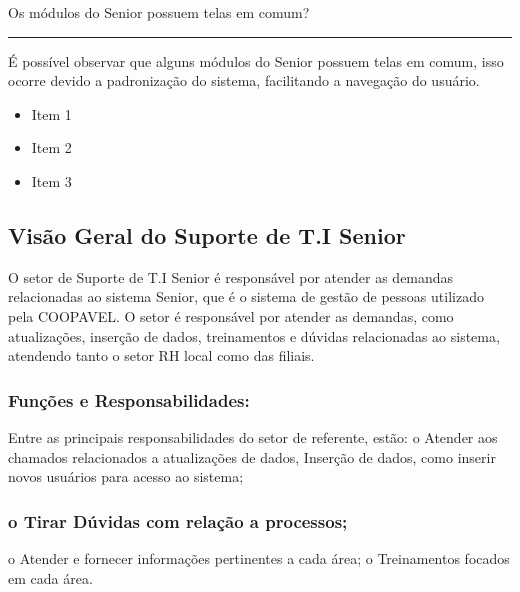 \documentclass[letterpaper,10pt,portuges]{sphinxmanual}
\begin{document}
\sphinxAtStartPar
Os módulos do Senior possuem telas em comum?


\bigskip\hrule\bigskip


\sphinxAtStartPar
É possível observar que alguns módulos do Senior possuem telas em comum, isso ocorre devido a padronização do sistema,
facilitando a navegação do usuário.
\begin{itemize}
\item {} 
\sphinxAtStartPar
Item 1

\item {} 
\sphinxAtStartPar
Item 2

\item {} 
\sphinxAtStartPar
Item 3

\end{itemize}

\noindent{}

\sphinxstepscope


\subsection{Visão Geral do Suporte de T.I Senior}
\label{\detokenize{visao_geral:visao-geral-do-suporte-de-t-i-senior}}\label{\detokenize{visao_geral::doc}}
\sphinxAtStartPar
O setor de Suporte de T.I Senior é responsável por atender as demandas
relacionadas ao sistema Senior, que é o sistema de gestão de pessoas
utilizado pela COOPAVEL. O setor é responsável por atender as demandas, como atualizações, inserção de dados, treinamentos
e dúvidas relacionadas ao sistema, atendendo tanto o setor RH local como das filiais.


\subsubsection{Funções e Responsabilidades:}
\label{\detokenize{visao_geral:funcoes-e-responsabilidades}}
\sphinxAtStartPar
Entre as principais responsabilidades do setor de referente, estão:
o Atender aos chamados relacionados a atualizações de dados,
Inserção de dados, como inserir novos usuários para acesso ao
sistema;


\subsubsection{o Tirar Dúvidas com relação a processos;}
\label{\detokenize{visao_geral:o-tirar-duvidas-com-relacao-a-processos}}
\sphinxAtStartPar
o Atender e fornecer informações pertinentes a cada área;
o Treinamentos focados em cada área.
\end{document}
